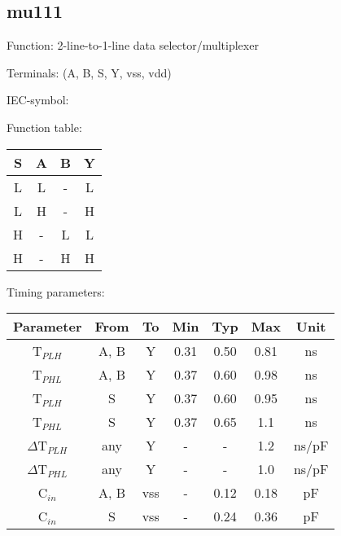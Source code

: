 \subsection{mu111}

Function: 2-line-to-1-line data selector/multiplexer

Terminals: (A, B, S, Y, vss, vdd)


IEC-symbol:
\begin{figure}[bth]
\end{figure}

\begin{minipage}[t]{0.3\textwidth}
Function table:\\

\begin{tabular}{|c|cc||c|}
\hline
S	&A	&B	&Y\\
\hline
L	&L	&-	&L\\
L	&H	&-	&H\\
H	&-	&L	&L\\
H	&-	&H	&H\\
\hline
\end{tabular}
\end{minipage}
\hfill
\begin{minipage}[t]{0.6\textwidth}
Timing parameters:\\

\begin{tabular}{|c|cc|ccc|c|}
\hline
Parameter               &From            &To   	&Min	&Typ	&Max    &Unit\\
\hline
T$_{PLH}$               &A, B     	&Y      &0.31	&0.50	&0.81    &ns\\
T$_{PHL}$               &A, B    	&Y      &0.37	&0.60	&0.98    &ns\\
T$_{PLH}$               &S         	&Y      &0.37	&0.60	&0.95    &ns\\
T$_{PHL}$               &S         	&Y      &0.37	&0.65	&1.1    &ns\\
\hline
$\Delta$T$_{PLH}$       &any           &Y      &-	&-	&1.2    &ns/pF\\
$\Delta$T$_{PHL}$       &any           &Y      &-	&-	&1.0    &ns/pF\\
\hline
C$_{in}$                &A, B    	&vss   &-	&0.12	&0.18   &pF\\
C$_{in}$                &S             	&vss   &-	&0.24	&0.36   &pF\\
\hline
\end{tabular}
\end{minipage}
\\

